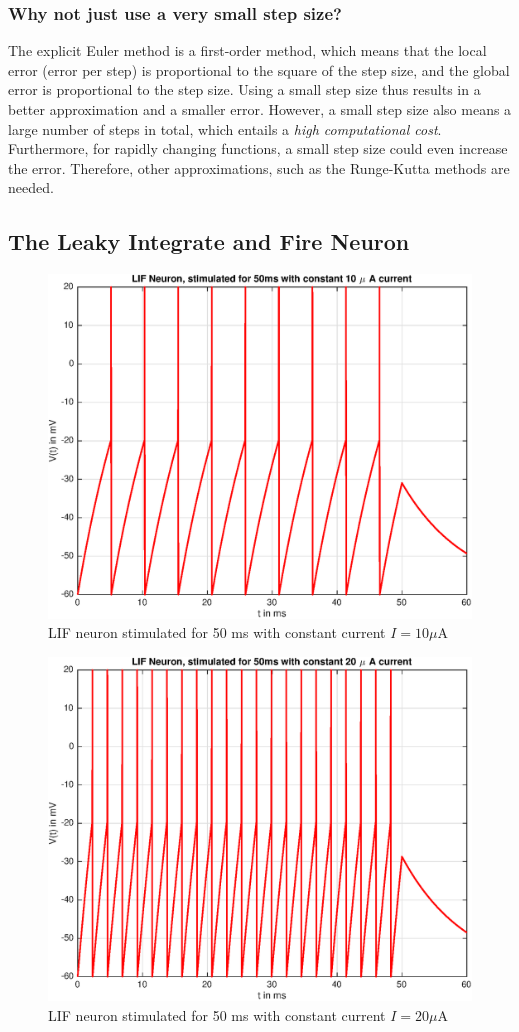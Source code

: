\documentclass[
a4paper, 
12pt, 
]{article}
\begin{document}
	\subsubsection*{Why not just use a very small step size?}
	The explicit Euler method is a first-order method, which means that the local error (error per step) is proportional to the square of the step size, and the global error is proportional to the step size. Using a small step size thus results in a better approximation and a smaller error. However, a small step size also means a large number of steps in total, which entails a \textit{high computational cost}. Furthermore, for rapidly changing functions, a small step size could even increase the error. Therefore, other approximations, such as the Runge-Kutta methods are needed. 
	
	
	
	\subsection{The Leaky Integrate and Fire Neuron}
	\begin{figure}[h]
\centering
\includegraphics[width=0.7\linewidth]{Plots/LIF_10c}
\caption{LIF neuron stimulated for 50 ms with constant current $I=10\mu$A}
\label{fig:LIF_10c}
\end{figure}

\begin{figure}[h]
	\centering
	\includegraphics[width=0.7\linewidth]{Plots/LIF_20c}
	\caption{LIF neuron stimulated for 50 ms with constant current $I=20\mu$A}
	\label{fig:LIF_20c}
\end{figure}
\end{document}
